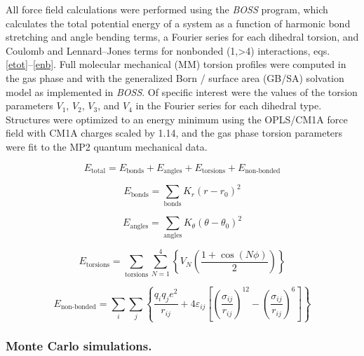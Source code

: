 \documentclass[12pt]{report}
\begin{document}
All force field calculations were performed using the \textit{BOSS} program,\cite{jorg2005} which calculates the total potential energy of a system as a function of harmonic bond stretching and angle bending terms, a Fourier series for each dihedral torsion, and Coulomb and Lennard--Jones terms for nonbonded (1,>4) interactions, eqs. \ref{etot}--\ref{enb}. Full molecular mechanical (MM) torsion profiles were computed in the gas phase and with the generalized Born / surface area (GB/SA) solvation model as implemented in \textit{BOSS}\@. Of specific interest were the values of the torsion parameters $V_1$, $V_2$, $V_3$, and $V_4$ in the Fourier series for each dihedral type. Structures were optimized to an energy minimum using the OPLS/CM1A force field with CM1A charges scaled by 1.14, and the gas phase torsion parameters were fit to the MP2 quantum mechanical data.

\begin{equation}
\label{etot}
E_{\textrm{total}} = E_{\textrm{bonds}} + E_{\textrm{angles}} + E_{\textrm{torsions}} + E_{\textrm{non-bonded}}
\end{equation}

\vspace*{-0.45cm}
\begin{equation}
\label{ebonds}
E_{\textrm{bonds}} = \sum_{\textrm{bonds}} K_r (r - r_0)^2
\end{equation}

\vspace*{-0.2cm}
\begin{equation}
\label{eangs}
E_{\textrm{angles}} = \sum_{\textrm{angles}} K_\theta (\theta - \theta_0)^2
\end{equation}

\begin{equation}
\label{edih}
E_{\textrm{torsions}} = \sum_{\textrm{torsions}} \sum_{N=1}^4 \left\{ V_{N} \left( \frac{1+\cos(N\phi)}{2} \right) \right\}
\end{equation}

\begin{equation}
\label{enb}
E_{\textrm{non-bonded}} = \sum_i \sum_j \left\{ \frac{q_i q_j e^2}{r_{ij}} + 4\varepsilon_{ij}\left[\left(\frac{\sigma_{ij}}{r_{ij}}\right)^{12}-\left(\frac{\sigma_{ij}}{r_{ij}}\right)^{6}\right] \right\}
\end{equation}
\vspace*{-0.4cm}

\subsubsection{Monte Carlo simulations.}
\end{document}
